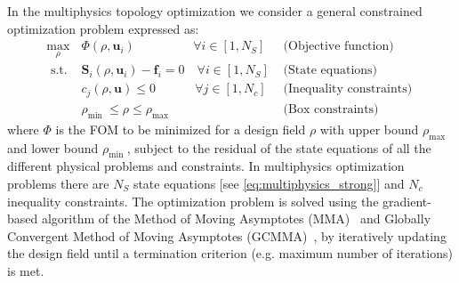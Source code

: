     In the multiphysics topology optimization we consider a general constrained optimization problem 
    expressed as:
    \begin{equation}
        \begin{array}{clr}
            \max\limits_{\rho}                        & \Phi(\rho, \mathbf{u}_i) \quad \quad \quad \quad
            \,\,\,\, \forall i \in\left[1, N_S\right] & \text { (Objective function) }                                                         \\
            \text { s.t. }                            & \mathbf{S}_i(\rho, \mathbf{u}_i)-\mathbf{f}_i=0 \quad
            \forall i \in\left[1, N_S\right]          & \text { (State equations) }                                                            \\
                                                      & c_j(\rho, \mathbf{u}) \leq 0 \quad \quad \quad \, \forall j \in\left[1,
            N_c\right]                                & \text { (Inequality constraints) }                                                     \\
                                                      & \rho_{\text {min }} \leq \rho \leq \rho_{\text {max }}                  & \text { (Box
                constraints) }
        \end{array}
    \end{equation}
    where $\Phi$ is the FOM to be minimized for a design field $\rho$ with upper
    bound $\rho_{\text {max }}$ and lower bound $\rho_{\text {min }}$,
    subject to the residual of the state equations of all the different physical
    problems and constraints. In multiphysics optimization problems
    there are $N_S$ state equations [see \eqref{eq:multiphysics_strong}]
    and  $N_c$ inequality constraints. The optimization problem is solved using
    the gradient-based algorithm of the Method of Moving
    Asymptotes (MMA)~\cite{MMA} and Globally Convergent Method of Moving Asymptotes
    (GCMMA)~\cite{GCMMA}, by iteratively updating the design field until a
    termination criterion (e.g. maximum number of iterations) is met.

